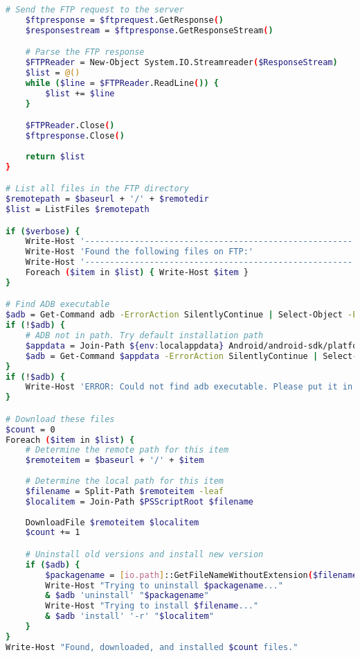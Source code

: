 \begin{lstlisting}[language=bash,caption=Powershell script that downloads and installs newest APKs,label=lst:download_install_apks_windows]
    # Send the FTP request to the server
    $ftpresponse = $ftprequest.GetResponse()
    $responsestream = $ftpresponse.GetResponseStream()

    # Parse the FTP response
    $FTPReader = New-Object System.IO.Streamreader($ResponseStream)
    $list = @()
    while ($line = $FTPReader.ReadLine()) {
        $list += $line
    }

    $FTPReader.Close()
    $ftpresponse.Close()
    
    return $list
}

# List all files in the FTP directory
$remotepath = $baseurl + '/' + $remotedir
$list = ListFiles $remotepath

if ($verbose) {
    Write-Host '------------------------------------------------------'
    Write-Host 'Found the following files on FTP:'
    Write-Host '------------------------------------------------------'
    Foreach ($item in $list) { Write-Host $item }
}

# Find ADB executable
$adb = Get-Command adb -ErrorAction SilentlyContinue | Select-Object -ExpandProperty Definition -First 1
if (!$adb) {
    # ADB not in path. Try default installation path
    $appdata = Join-Path ${env:localappdata} Android/android-sdk/platform-tools/adb.exe
    $adb = Get-Command $appdata -ErrorAction SilentlyContinue | Select-Object -ExpandProperty Definition -First 1
}
if (!$adb) {
    Write-Host 'ERROR: Could not find adb executable. Please put it in PATH.'
}

# Download these files
$count = 0
Foreach ($item in $list) {
    # Determine the remote path for this item
    $remoteitem = $baseurl + '/' + $item
    
    # Determine the local path for this item
    $filename = Split-Path $remoteitem -leaf
    $localitem = Join-Path $PSScriptRoot $filename
    
    DownloadFile $remoteitem $localitem
    $count += 1

    # Uninstall old versions and install new version    
    if ($adb) {
        $packagename = [io.path]::GetFileNameWithoutExtension($filename)
        Write-Host "Trying to uninstall $packagename..."
        & $adb 'uninstall' "$packagename"
        Write-Host "Trying to install $filename..."
        & $adb 'install' '-r' "$localitem"
    }
}
Write-Host "Found, downloaded, and installed $count files."
\end{lstlisting}